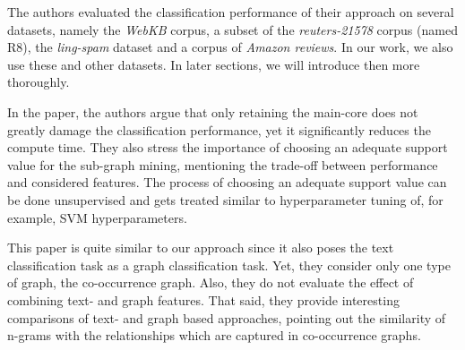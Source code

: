 The authors evaluated the classification performance of their approach on several datasets, namely the \textit{WebKB} corpus, a subset of the \textit{reuters-21578} corpus (named R8), the \textit{ling-spam} dataset and a corpus of \textit{Amazon reviews}.
In our work, we also use these and other datasets. In later sections, we will introduce then more thoroughly.

In the paper, the authors argue that only retaining the main-core does not greatly damage the classification performance, yet it significantly reduces the compute time.
They also stress the importance of choosing an adequate support value for the sub-graph mining, mentioning the trade-off between performance and considered features. The process of choosing an adequate support value can be done unsupervised and gets treated similar to hyperparameter tuning of, for example, SVM hyperparameters.

This paper is quite similar to our approach since it also poses the text classification task as a graph classification task. Yet, they consider only one type of graph, the co-occurrence graph.
Also, they do not evaluate the effect of combining text- and graph features.
That said, they provide interesting comparisons of text- and graph based approaches, pointing out the similarity of n-grams with the relationships which are captured in co-occurrence graphs.

